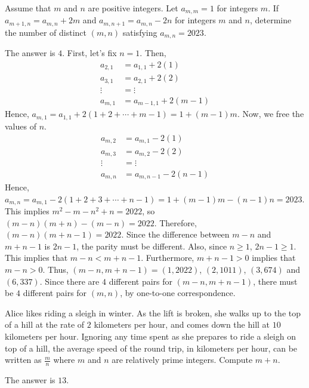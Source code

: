 \begin{problem}
Assume that $m$ and $n$ are positive integers. Let $a_{m,m}=1$ for integers $m$. If $a_{m+1,n}=a_{m,n}+2m$ and $a_{m,n+1}=a_{m,n}-2n$ for integers $m$ and $n$, determine the number of distinct $(m,n)$ satisfying $a_{m,n}=2023$.
\end{problem}

\begin{solution}
The answer is $4$. First, let's fix $n=1$. Then,
\begin{align*}
	a_{2,1}&=a_{1,1}+2(1)\\
	a_{3,1}&=a_{2,1}+2(2)\\
	\vdots &= \vdots\\
	a_{m,1}&=a_{m-1,1}+2(m-1)
\end{align*}
Hence, $a_{m,1}=a_{1,1}+2(1+2+\cdots+m-1)=1+(m-1)m$. Now, we free the values of $n$.
\begin{align*}
	a_{m,2}&=a_{m,1}-2(1)\\
	a_{m,3}&=a_{m,2}-2(2)\\
	\vdots&=\vdots\\
	a_{m,n}&=a_{m,n-1}-2(n-1)
\end{align*}
Hence, $a_{m,n}=a_{m,1}-2(1+2+3+\cdots+n-1)=1+(m-1)m-(n-1)n=2023$.\\
This implies $m^2-m-n^2+n=2022$, so $(m-n)(m+n)-(m-n)=2022$. Therefore, $(m-n)(m+n-1)=2022$. Since the difference between $m-n$ and $m+n-1$ is $2n-1$, the parity must be different. Also, since $n\geq 1$, $2n-1\geq1$. This implies that $m-n<m+n-1$. Furthermore, $m+n-1>0$ implies that $m-n>0$. Thus, $(m-n,m+n-1)=(1,2022)$, $(2,1011)$, $(3,674)$ and $(6,337)$. Since there are $4$ different pairs for $(m-n,m+n-1)$, there must be $4$ different pairs for $(m,n)$, by one-to-one correspondence.
\end{solution}

\begin{problem}
Alice likes riding a sleigh in winter. As the lift is broken, she walks up to the top of a hill at the rate of $2$ kilometers per hour, and comes down the hill at $10$ kilometers per hour. Ignoring any time spent as she prepares to ride a sleigh on top of a hill, the average speed of the round trip, in kilometers per hour, can be written as $\frac{m}{n}$ where $m$ and $n$ are relatively prime integers. Compute $m+n$.
\end{problem}

\begin{solution}
The answer is $13$.
\end{solution}

